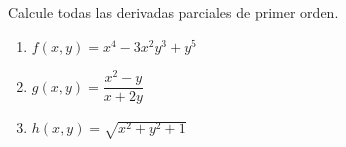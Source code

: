 Calcule todas las derivadas parciales de primer orden.
\begin{enumerate}
    \item $f(x, y) = x^4 - 3x^2y^3 + y^5$
    \item $g(x, y) = \dfrac{x^2 - y}{x + 2y}$
    \item $h(x, y) = \sqrt{x^2 + y^2 + 1}$
\end{enumerate}
